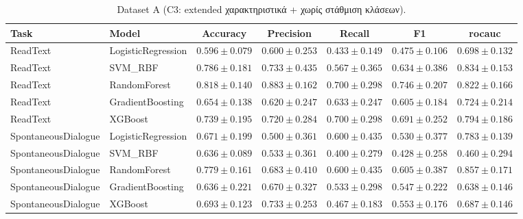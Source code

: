 \begin{table}[H]
    \centering
    \caption{Dataset A (C3: extended χαρακτηριστικά + χωρίς στάθμιση κλάσεων).}
    \label{tab:appendix-c3-dataset-a}
    \scriptsize
    \begin{tabular}{@{}llccccc@{}}
        \toprule
        Task & Model & Accuracy & Precision & Recall & F1 & \gls{rocauc} \\
        \midrule
        ReadText & LogisticRegression & $0.596 \pm 0.079$ & $0.600 \pm 0.253$ & $0.433 \pm 0.149$ & $0.475 \pm 0.106$ & $0.698 \pm 0.132$ \\
        ReadText & SVM\_RBF & $0.786 \pm 0.181$ & $0.733 \pm 0.435$ & $0.567 \pm 0.365$ & $0.634 \pm 0.386$ & $0.834 \pm 0.153$ \\
        ReadText & RandomForest & $0.818 \pm 0.140$ & $0.883 \pm 0.162$ & $0.700 \pm 0.298$ & $0.746 \pm 0.207$ & $0.822 \pm 0.166$ \\
        ReadText & GradientBoosting & $0.654 \pm 0.138$ & $0.620 \pm 0.247$ & $0.633 \pm 0.247$ & $0.605 \pm 0.184$ & $0.724 \pm 0.214$ \\
        ReadText & XGBoost & $0.739 \pm 0.195$ & $0.720 \pm 0.284$ & $0.700 \pm 0.298$ & $0.691 \pm 0.252$ & $0.794 \pm 0.186$ \\
        \midrule
        SpontaneousDialogue & LogisticRegression & $0.671 \pm 0.199$ & $0.500 \pm 0.361$ & $0.600 \pm 0.435$ & $0.530 \pm 0.377$ & $0.783 \pm 0.139$ \\
        SpontaneousDialogue & SVM\_RBF & $0.636 \pm 0.089$ & $0.533 \pm 0.361$ & $0.400 \pm 0.279$ & $0.428 \pm 0.258$ & $0.460 \pm 0.294$ \\
        SpontaneousDialogue & RandomForest & $0.779 \pm 0.161$ & $0.683 \pm 0.410$ & $0.600 \pm 0.435$ & $0.605 \pm 0.387$ & $0.857 \pm 0.171$ \\
        SpontaneousDialogue & GradientBoosting & $0.636 \pm 0.221$ & $0.670 \pm 0.327$ & $0.533 \pm 0.298$ & $0.547 \pm 0.222$ & $0.638 \pm 0.146$ \\
        SpontaneousDialogue & XGBoost & $0.693 \pm 0.123$ & $0.733 \pm 0.253$ & $0.467 \pm 0.183$ & $0.553 \pm 0.176$ & $0.687 \pm 0.146$ \\
        \bottomrule
    \end{tabular}
\end{table}

